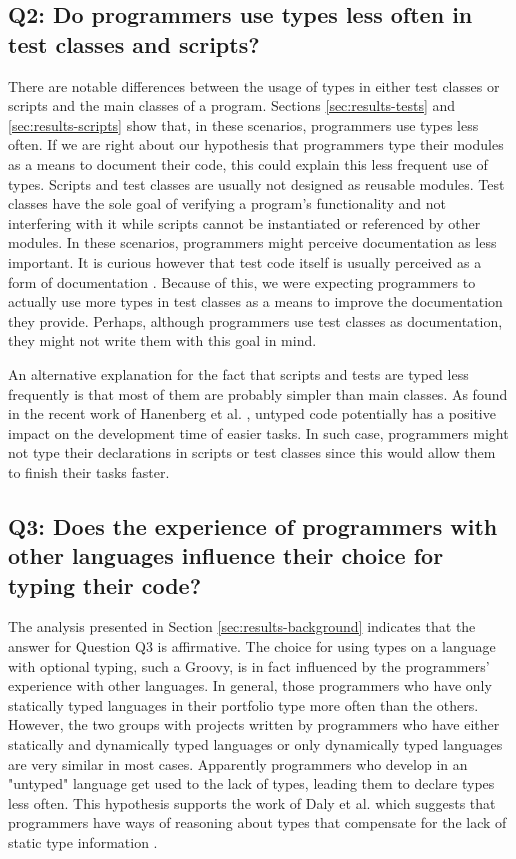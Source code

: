 \documentclass[]{sigplanconf}
\begin{document}
\subsection*{Q2: Do programmers use types less often in test classes and scripts?\label{discussion-q2}}
There are notable differences between the usage of types in either test classes or scripts and the main classes of a program.
Sections \ref{sec:results-tests} and \ref{sec:results-scripts} show that, in these scenarios, programmers use types less often.
If we are right about our hypothesis that programmers type their modules as a means to document their code, this could explain this less frequent use of types.
Scripts and test classes are usually not designed as reusable modules.
Test classes have the sole goal of verifying a program's functionality and not interfering with it while scripts cannot be instantiated or referenced by other modules.
In these scenarios, programmers might perceive documentation as less important.
It is curious however that test code itself is usually perceived as a form of documentation \cite{Beck03,Meyerovich13}.
Because of this, we were expecting programmers to actually use more types in test classes as a means to improve the documentation they provide.
Perhaps, although programmers use test classes as documentation, they might not write them with this goal in mind.

An alternative explanation for the fact that scripts and tests are typed less frequently is that most of them are probably simpler than main classes.
As found in the recent work of Hanenberg et al. \cite{Hanenberg13}, untyped code potentially has a positive impact on the development time of easier tasks.
In such case, programmers might not type their declarations in scripts or test classes since this would allow them to finish their tasks faster.

\subsection*{Q3: Does the experience of programmers with other languages influence their choice for typing their code?\label{discussion-q3}}
The analysis presented in Section \ref{sec:results-background} indicates that the answer for Question Q3 is affirmative.
The choice for using types on a language with optional typing, such a Groovy, is in fact influenced by the programmers' experience with other languages.
In general, those programmers who have only statically typed languages in their portfolio type more often than the others.
However, the two groups with projects written by programmers who have either statically and dynamically typed languages or only dynamically typed languages are very similar in most cases.
Apparently programmers who develop in an "untyped" language get used to the lack of types, leading them to declare types less often.
This hypothesis supports the work of Daly et al. which suggests that programmers have ways of reasoning about types that compensate for the lack of static type information \cite{ruby_vs_druby}.
\end{document}
